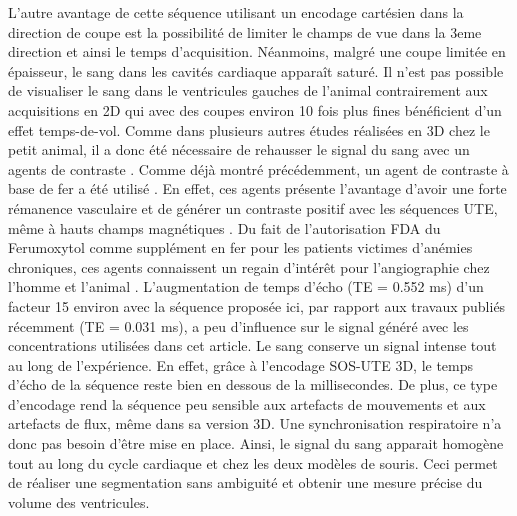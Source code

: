 L’autre avantage de cette séquence utilisant un encodage cartésien dans la direction de coupe est la possibilité de limiter le champs de vue dans la 3eme direction et ainsi le temps d’acquisition. Néanmoins, malgré une coupe limitée en épaisseur, le sang dans les cavités cardiaque apparaît saturé. Il n’est pas possible de visualiser le sang dans le ventricules gauches de l’animal contrairement aux acquisitions en 2D qui avec des coupes environ 10 fois plus fines bénéficient d'un effet temps-de-vol. Comme dans plusieurs autres études réalisées en 3D chez le petit animal, il a donc été nécessaire de rehausser le signal du sang avec un agents de contraste \cite{Bucholz:2008uq,Bucholz:2010aa}. Comme déjà montré précédemment, un agent de contraste à base de fer a été utilisé \cite{trotier2015positive}. En effet, ces agents présente l’avantage d’avoir une forte rémanence vasculaire et de générer un contraste positif avec les séquences UTE, même à hauts champs magnétiques \cite{Gharagouzloo2015Quantitative-co}. Du fait de l’autorisation FDA du Ferumoxytol comme supplément en fer pour les patients victimes d’anémies chroniques, ces agents connaissent un regain d’intérêt pour l’angiographie chez l’homme et l’animal \cite{ruangwattanapaisarn2014ferumoxytol}. L’augmentation de temps d’écho (TE = 0.552 ms) d’un facteur 15 environ avec la séquence proposée ici, par rapport aux travaux publiés récemment (TE = 0.031 ms), a peu d’influence sur le signal généré avec les concentrations utilisées dans cet article. Le sang conserve un signal intense tout au long de l’expérience. En effet, grâce à l’encodage SOS-UTE 3D, le temps d’écho de la séquence reste bien en dessous de la millisecondes. De plus, ce type d’encodage rend la séquence peu sensible aux artefacts de mouvements et aux artefacts de flux, même dans sa version 3D. Une synchronisation respiratoire n’a donc pas besoin d’être mise en place. Ainsi, le signal du sang apparait homogène tout au long du cycle cardiaque et chez les deux modèles de souris. Ceci permet de réaliser une segmentation sans ambiguité et obtenir une mesure précise du volume des ventricules. 

